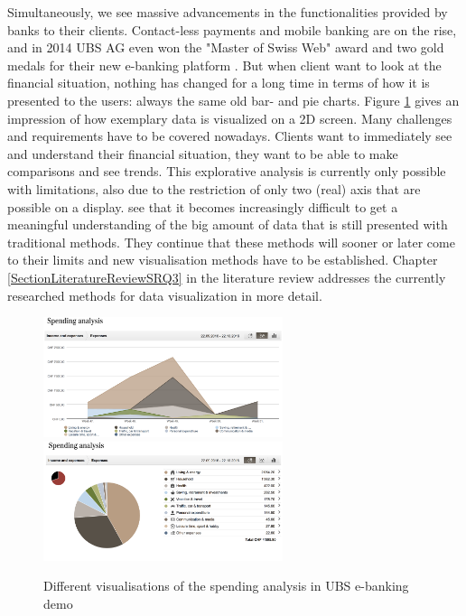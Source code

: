 Simultaneously, we see massive advancements in the functionalities provided by banks to their clients. Contact-less payments and mobile banking are on the rise, and in 2014 UBS AG even won the "Master of Swiss Web" award and two gold medals for their new e-banking platform \citep{UBSAG2014}. But when client want to look at the financial situation, nothing has changed for a long time in terms of how it is presented to the users: always the same old bar- and pie charts. Figure \ref{fig:ubsspendinganalysis} gives an impression of how exemplary data is visualized on a 2D screen. Many challenges and requirements have to be covered nowadays. Clients want to immediately see and understand their financial situation, they want to be able to make comparisons and see trends. This explorative analysis is currently only possible with limitations, also due to the restriction of only two (real) axis that are possible on a display. \cite{Jamieson2007} see that it becomes increasingly difficult to get a meaningful understanding of the big amount of data that is still presented with traditional methods. They continue that these methods will sooner or later come to their limits and new visualisation methods have to be established. Chapter \ref{SectionLiteratureReviewSRQ3} in the literature review addresses the currently researched methods for data visualization in more detail.
\begin{figure}[h]
	\begin{center}
		\includegraphics[width=7cm]{03_Figures/06_Introduction/UBSAG2016_SpendingAnalysis2.png}
		\includegraphics[width=7cm]{03_Figures/06_Introduction/UBSAG2016_SpendingAnalysis.png}
		\caption[Different visualisations of the spending analysis in UBS e-banking demo]{Different visualisations of the spending analysis in UBS e-banking demo \citep{UBSAG2016}}
		\label{fig:ubsspendinganalysis}
	\end{center}
\end{figure}

